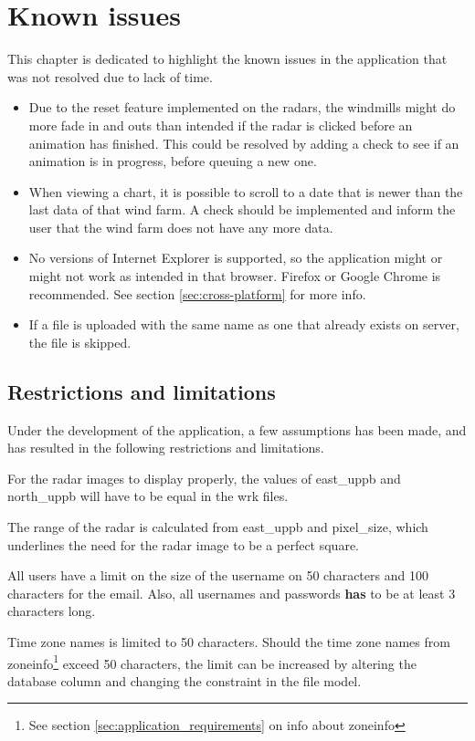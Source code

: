 \chapter{Known issues}
This chapter is dedicated to highlight the known issues in the application that was not resolved due to lack of time.
\begin{itemize}
\item Due to the reset feature implemented on the radars, the windmills might do more fade in and outs than intended if the radar is clicked before an animation has finished.
This could be resolved by adding a check to see if an animation is in progress, before queuing a new one.
\item When viewing a chart, it is possible to scroll to a date that is newer than the last data of that wind farm. A check should be implemented and inform the user that the wind farm does not have any more data.
\item No versions of Internet Explorer is supported, so the application might or might not work as intended in that browser. Firefox or Google Chrome is recommended. See section \ref{sec:cross-platform} for more info.
\item If a file is uploaded with the same name as one that already exists on server, the file is skipped.
\end{itemize}

\section{Restrictions and limitations}
Under the development of the application, a few assumptions has been made, and has resulted in the following restrictions and limitations.

For the radar images to display properly, the values of \textsf{east\_uppb} and \textsf{north\_uppb} will have to be equal in the \textsf{wrk} files.

The range of the radar is calculated from \textsf{east\_uppb} and \textsf{pixel\_size}, which underlines the need for the radar image to be a perfect square.

All users have a limit on the size of the username on 50 characters and 100 characters for the email.
Also, all usernames and passwords \textbf{has} to be at least 3 characters long.

Time zone names is limited to 50 characters. Should the time zone names from zoneinfo\footnote{See section \ref{sec:application_requirements} on info about zoneinfo} exceed 50 characters, the limit can be increased by altering the database column and changing the constraint in the file model.